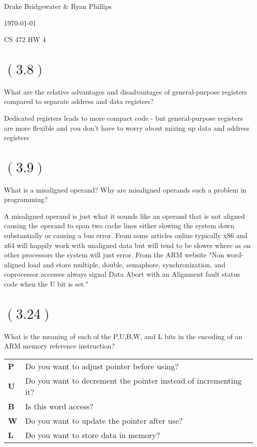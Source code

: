 \documentclass[letterpaper,12pt,titlepage]{article}
\def\name{Drake Bridgewater \& Ryan Phillips}
\begin{document}
\hfill \name

\hfill \today

\hfill CS 472 HW 4

\section*{$(3.8)$} What are the relative advantages and disadvantages of general-purpose registers compared to separate address and data registers?

\begin{mdframed}[style=MyFrame]
Dedicated registers leads to more compact code - but general-purpose registers are more flexible and you don't have to worry about mixing up data and address registers
\end{mdframed}

\section*{$(3.9)$} What is a misaligned operand? Why are misaligned operands such a problem in programming?

\begin{mdframed}[style=MyFrame]
A misaligned operand is just what it sounds like an operand that is not aligned causing the operand to span two cache lines either slowing the system down substantially or causing a bus error. From some articles online typically x86 and x64 will happily work with unaligned data but will tend to be slower where as on other processors the system will just error. From the ARM website "Non word-aligned load and store multiple, double, semaphore, synchronization, and coprocessor accesses always signal Data Abort with an Alignment fault status code when the U bit is set." \cite{ARM}
\end{mdframed}

\section*{$(3.24)$} What is the meaning of each of the P,U,B,W, and L bits in the encoding of an ARM memory reference instruction?
\begin{mdframed}[style=MyFrame]
\begin{tabular}{l l}
\textbf{P} & Do you want to adjust pointer before using?\\
\textbf{U} & Do you want to decrement the pointer instead of incrementing it?\\
\textbf{B} & Is this word access?\\
\textbf{W} & Do you want to update the pointer after use?\\
\textbf{L} & Do you want to store data in memory?
\end{tabular}
\end{mdframed}
\end{document}
